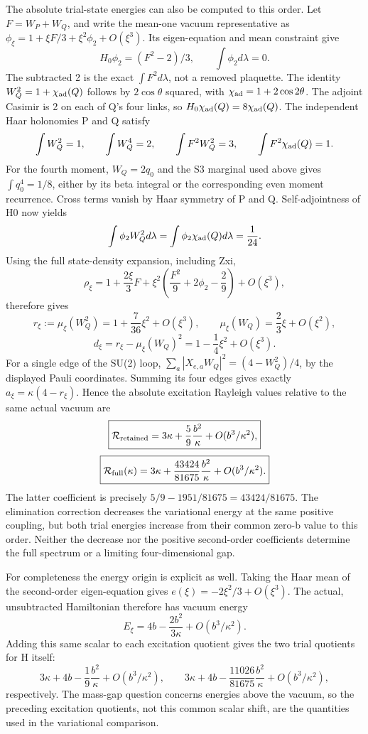 \documentclass[
  11pt,
]{article}
\begin{document}
The absolute trial-state energies can also be computed to this order.
Let \(F=W_P+W_Q\), and write the mean-one vacuum representative as
\(\phi_\xi=1+\xi F/3+\xi^2\phi_2+O(\xi^3)\). Its eigen-equation and mean
constraint give \[
 H_0\phi_2=(F^2-2)/3,\qquad \int\phi_2d\lambda=0.
\] The subtracted 2 is the exact \(\int F^2d\lambda\), not a removed
plaquette. The identity \(W_Q^2=1+\chi_{\rm ad}(Q)\) follows by
\(2\cos\theta\) squared, with \(\chi_{\rm ad}=1+2\cos2\theta\). The
adjoint Casimir is 2 on each of Q's four links, so
\(H_0\chi_{\rm ad}(Q)=8\chi_{\rm ad}(Q)\). The independent Haar
holonomies P and Q satisfy \[
 \int W_Q^2=1,\qquad\int W_Q^4=2,\qquad
 \int F^2W_Q^2=3,\qquad\int F^2\chi_{\rm ad}(Q)=1.
\] For the fourth moment, \(W_Q=2q_0\) and the S3 marginal used above
gives \(\int q_0^4=1/8\), either by its beta integral or the
corresponding even moment recurrence. Cross terms vanish by Haar
symmetry of P and Q. Self-adjointness of H0 now yields \[
 \int\phi_2 W_Q^2d\lambda
 =\int\phi_2\chi_{\rm ad}(Q)d\lambda=\frac1{24}.
\] Using the full state-density expansion, including Zxi, \[
 \rho_\xi=1+\frac{2\xi}3F
     +\xi^2\left(\frac{F^2}{9}+2\phi_2-\frac29\right)+O(\xi^3),
\] therefore gives \[
 r_\xi:=\mu_\xi(W_Q^2)=1+\frac7{36}\xi^2+O(\xi^3),\qquad
 \mu_\xi(W_Q)=\frac23\xi+O(\xi^2),
\] \[
 d_\xi=r_\xi-\mu_\xi(W_Q)^2=1-\frac14\xi^2+O(\xi^3).
\] For a single edge of the SU(2) loop,
\(\sum_a|X_{e,a}W_Q|^2=(4-W_Q^2)/4\), by the displayed Pauli
coordinates. Summing its four edges gives exactly
\(a_\xi=\kappa(4-r_\xi)\). Hence the absolute excitation Rayleigh values
relative to the same actual vacuum are \[
 \boxed{\mathcal R_{\rm retained}
    =3\kappa+\frac59\frac{b^2}{\kappa}+O(b^3/\kappa^2),}
\] \[
 \boxed{\mathcal R_{\rm full}(\kappa)
    =3\kappa+\frac{43424}{81675}\frac{b^2}{\kappa}
         +O(b^3/\kappa^2).}
\] The latter coefficient is precisely \(5/9-1951/81675=43424/81675\).
The elimination correction decreases the variational energy at the same
positive coupling, but both trial energies increase from their common
zero-b value to this order. Neither the decrease nor the positive
second-order coefficients determine the full spectrum or a limiting
four-dimensional gap.

For completeness the energy origin is explicit as well. Taking the Haar
mean of the second-order eigen-equation gives
\(e(\xi)=-2\xi^2/3+O(\xi^3)\). The actual, unsubtracted Hamiltonian
therefore has vacuum energy \[
 E_\xi=4b-\frac{2b^2}{3\kappa}+O(b^3/\kappa^2).
\] Adding this same scalar to each excitation quotient gives the two
trial quotients for H itself: \[
 3\kappa+4b-\frac19\frac{b^2}{\kappa}+O(b^3/\kappa^2),\qquad
 3\kappa+4b-\frac{11026}{81675}\frac{b^2}{\kappa}
       +O(b^3/\kappa^2),
\] respectively. The mass-gap question concerns energies above the
vacuum, so the preceding excitation quotients, not this common scalar
shift, are the quantities used in the variational comparison.
\end{document}
